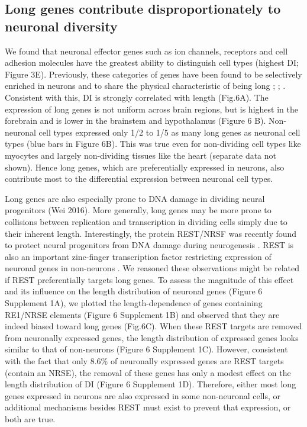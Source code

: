 \subsection{Long genes contribute disproportionately to neuronal diversity}

We found that neuronal effector genes such as ion channels, receptors and cell adhesion molecules have the greatest ability to distinguish cell types (highest DI; Figure 3E). Previously, these categories of genes have been found to be selectively enriched in neurons and to share the physical characteristic of being long \cite{Sugino_2014}; \cite{Gabel_2015}; \cite{Zylka_2015}. Consistent with this, DI is strongly correlated with length (Fig.6A). The expression of long genes is not uniform across brain regions, but is highest in the forebrain and is lower in the brainstem and hypothalamus (Figure 6 B). Non-neuronal cell types expressed only 1/2 to 1/5 as many long genes as neuronal cell types (blue bars in Figure 6B). This was true even for non-dividing cell types like myocytes and largely non-dividing tissues like the heart (separate data not shown). Hence long genes, which are preferentially expressed in neurons, also contribute most to the differential expression between neuronal cell types. 

Long genes are also especially prone to DNA damage in dividing neural progenitors (Wei 2016). More generally, long genes may be more prone to collisions between replication and transcription in dividing cells simply due to their inherent length. Interestingly, the protein REST/NRSF was recently found to protect neural progenitors from DNA damage during neurogenesis \cite{Nechiporuk_2016}. REST is also an important zinc-finger transcription factor restricting expression of neuronal genes in non-neurons \cite{RN1}\cite{RN2a}. We reasoned these observations might be related if REST preferentially targets long genes. To assess the magnitude of this effect and its influence on the length distribution of neuronal genes (Figure 6 Supplement 1A), we plotted the length-dependence of genes containing RE1/NRSE elements (Figure 6 Supplement 1B) and observed that they are indeed biased toward long genes (Fig.6C). When these REST targets are removed from neuronally expressed genes, the length distribution of expressed genes looks similar to that of non-neurons (Figure 6 Supplement 1C). However, consistent with the fact that only 8.6\% of neuronally expressed genes are REST targets (contain an NRSE), the removal of these genes has only a modest effect on the length distribution of DI (Figure 6 Supplement 1D). Therefore, either most  long genes expressed in neurons are also expressed in some non-neuronal cells, or additional mechanisms besides REST must exist to prevent that expression, or both are true. 


